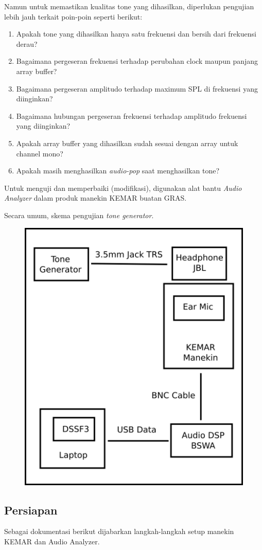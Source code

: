 \documentclass[12pt,]{article}
\begin{document}
	Namun untuk memastikan kualitas tone yang dihasilkan,
	diperlukan pengujian lebih jauh terkait poin-poin seperti berikut:
	\begin{enumerate}
		\item Apakah tone yang dihasilkan hanya satu frekuensi dan bersih dari frekuensi derau?
		\item Bagaimana pergeseran frekuensi terhadap perubahan clock maupun panjang array buffer?
		\item Bagaimana pergeseran amplitudo terhadap maximum SPL di frekuensi yang diinginkan?
		\item Bagaimana hubungan pergeseran frekuensi terhadap amplitudo frekuensi yang diinginkan?
		\item Apakah array buffer yang dihasilkan sudah sesuai dengan array untuk channel mono?
		\item Apakah masih menghasilkan \textit{audio-pop} saat menghasilkan tone?
	\end{enumerate}

	Untuk menguji dan memperbaiki (modifikasi), digunakan alat bantu \textit{Audio Analyzer} dalam
	produk manekin KEMAR buatan GRAS.
	
	Secara umum, skema pengujian \textit{tone generator}.
	
	\begin{figure}[H]
		\centering
		\includegraphics[width=0.5\linewidth]{images/kemar}
	\end{figure}

	\subsection{Persiapan}  
	
	Sebagai dokumentasi berikut dijabarkan langkah-langkah setup manekin KEMAR dan Audio Analyzer.
\end{document}
